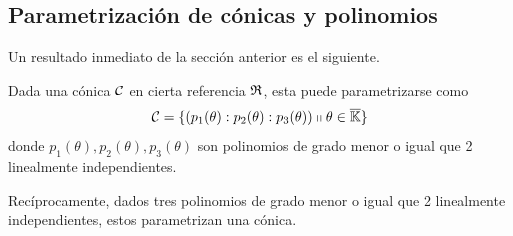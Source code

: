 \subsection{Parametrización de cónicas y polinomios}
Un resultado inmediato de la sección anterior es el siguiente.
\begin{lem}
	\label{C8_lem_conicas_polinomios}
	Dada una cónica $\mathcal{C}$ en cierta referencia $\mathfrak{R}$, esta puede parametrizarse como 
	\begin{equation}
	\label{C8_eq_parametrizacion_polinomios}
	\mathcal{C}=\{(p_1(\theta):p_2(\theta):p_3(\theta))\shortparallel\theta\in\overline{\mathbb{K}}\}
	\end{equation}
	donde $p_1(\theta),p_2(\theta),p_3(\theta)$ son polinomios de grado menor o igual que 2 linealmente independientes.
	
	Recíprocamente, dados tres polinomios de grado menor o igual que 2 linealmente independientes, estos parametrizan una cónica.
\end{lem}
